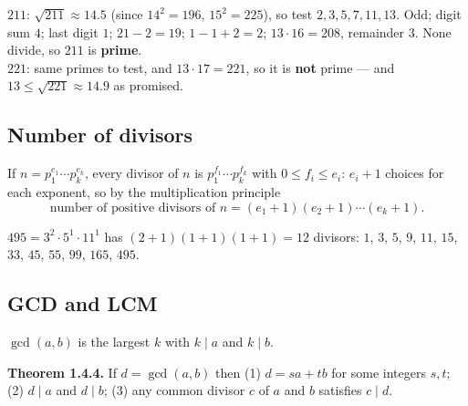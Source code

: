 \documentclass{fkt-notes}
\theoremstyle{definition}
\begin{document}
\begin{example}
  $211$: $\sqrt{211} \approx 14.5$ (since $14^2 = 196$, $15^2 = 225$), so
  test $2, 3, 5, 7, 11, 13$. Odd; digit sum $4$; last digit $1$;
  $21 - 2 = 19$; $1 - 1 + 2 = 2$; $13 \cdot 16 = 208$, remainder $3$.
  None divide, so $211$ is \textbf{prime}.\\
  $221$: same primes to test, and $13 \cdot 17 = 221$, so it is
  \textbf{not} prime --- and $13 \leq \sqrt{221} \approx 14.9$ as promised.
\end{example}

\subsection{Number of divisors}
\begin{rulepar}
  If $n = p_1^{e_1} \cdots p_k^{e_k}$, every divisor of $n$ is
  $p_1^{f_1} \cdots p_k^{f_k}$ with $0 \leq f_i \leq e_i$: $e_i + 1$
  choices for each exponent, so by the multiplication principle
  \[
    \text{number of positive divisors of } n = (e_1 + 1)(e_2 + 1) \cdots (e_k + 1).
  \]
\end{rulepar}

\begin{example}
  $495 = 3^2 \cdot 5^1 \cdot 11^1$ has $(2+1)(1+1)(1+1) = 12$ divisors:
  $1$, $3$, $5$, $9$, $11$, $15$, $33$, $45$, $55$, $99$, $165$, $495$.
\end{example}


\subsection{GCD and LCM}\label{qg:gcd}
%
$\gcd(a,b)$ is the largest $k$ with $k\mid a$ and $k\mid b$.

\begin{rulepar}
  \textbf{Theorem 1.4.4.} If $d=\gcd(a,b)$ then (1) $d=sa+tb$ for some
  integers $s,t$; (2) $d\mid a$ and $d\mid b$; (3) any common divisor $c$ of
  $a$ and $b$ satisfies $c\mid d$.
\end{rulepar}
\end{document}
